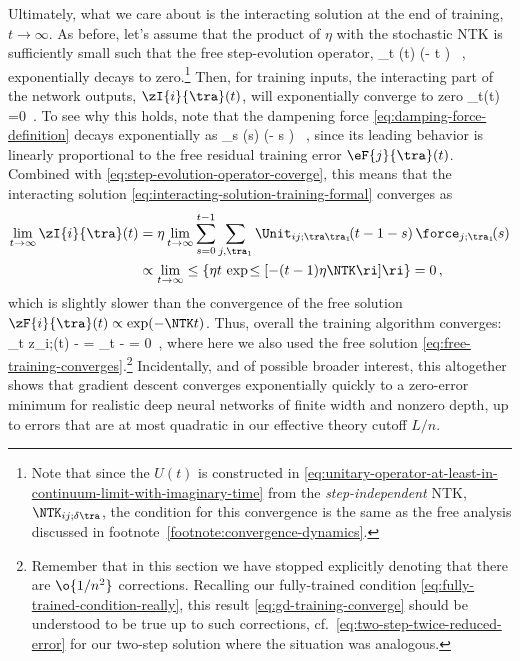 Ultimately, what we care about is the
interacting
solution at the end of training, $t\to \infty$. As before, let's assume that the product of $\eta$ with the stochastic NTK is sufficiently small such that the free step-evolution operator,
\be\label{eq:step-evolution-operator-coverge}
\lim_{t\to\infty} \Unit(t) \propto \exp\!\le(- \eta \NTK t \ri) \, ,
\ee
exponentially decays to zero.\footnote{
    Note that since the  $U(t)$ is constructed in \eqref{eq:unitary-operator-at-least-in-continuum-limit-with-imaginary-time} from the \emph{step-independent} NTK, $\NTK_{ij;\delta\tra}$, the condition for this convergence is the same as the free analysis discussed in footnote~\ref{footnote:convergence-dynamics}. %
}
Then, for training inputs, the interacting part of the network outputs, $\zI{i}{\tra}(t)$, will exponentially converge to zero
\be\label{eq:interacting-training-converge}
\lim_{t\to\infty}(t) =0\, .
\ee
To see why 
this
holds, note that the dampening force \eqref{eq:damping-force-definition} decays exponentially as
\be
\lim_{s\to\infty} \force(s) \propto \exp\!\le(- \eta\NTK s \ri) \, ,
\ee
since its leading behavior is linearly proportional to the free residual training error $\eF{j}{\tra}(t)$.
Combined with \eqref{eq:step-evolution-operator-coverge}, this means that the interacting solution \eqref{eq:interacting-solution-training-formal} converges as
\begin{align}\label{eq}
\lim_{t\to\infty}\zI{i}{\tra}(t)&=\eta\lim_{t\to\infty}\sum_{s=0}^{t-1}\sum_{j,\tra_1} \Unit_{ij;\tra\tra_1}\!(t-1-s)\,\force_{j;\tra_1}\!(s) \notag \\
&\propto \lim_{ t\to\infty}\le\{  \eta t \,  \exp\!\le[- (t-1) \eta \NTK  \ri]\ri\}=0 \, ,
\end{align}
which is slightly slower than the convergence of the free solution $\zF{i}{\tra}(t) \propto \exp(-\NTK t)$.
Thus, overall the training algorithm converges:
\be\label{eq:gd-training-converge}
\lim_{t\to\infty} z_{i;\tra}(t) -  =  \lim_{t\to\infty} -   = 0\, ,
\ee
where here we also used the free solution \eqref{eq:free-training-converges}.\footnote{
    Remember that in this section we have stopped explicitly denoting that there are $\o{1/n^2}$ corrections. Recalling our fully-trained condition \eqref{eq:fully-trained-condition-really}, this result \eqref{eq:gd-training-converge} should be understood to be true up to such corrections, cf.~\eqref{eq:two-step-twice-reduced-error} for our two-step solution where the situation was analogous.
} 
Incidentally, and of possible broader interest, this altogether shows that gradient descent converges exponentially quickly to a zero-error minimum for realistic deep neural networks of finite width and nonzero depth, up to errors that are at most quadratic in our effective theory cutoff $L/n$.

